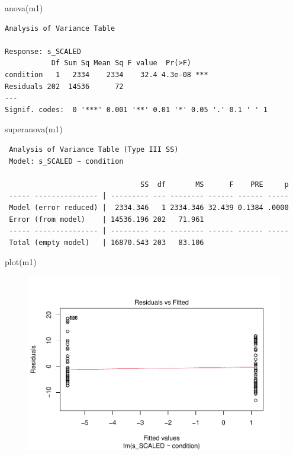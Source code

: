 \documentclass[
  letterpaper,
  DIV=11,
  numbers=noendperiod]{scrreprt}
\newenvironment{Shaded}{\begin{snugshade}}{\end{snugshade}}
\newcommand{\FunctionTok}[1]{\textcolor[rgb]{0.28,0.35,0.67}{#1}}
\newcommand{\NormalTok}[1]{\textcolor[rgb]{0.00,0.23,0.31}{#1}}
\begin{document}
\begin{Shaded}
\begin{Highlighting}[]
\FunctionTok{anova}\NormalTok{(m1)}
\end{Highlighting}
\end{Shaded}

\begin{verbatim}
Analysis of Variance Table

Response: s_SCALED
           Df Sum Sq Mean Sq F value  Pr(>F)    
condition   1   2334    2334    32.4 4.3e-08 ***
Residuals 202  14536      72                    
---
Signif. codes:  0 '***' 0.001 '**' 0.01 '*' 0.05 '.' 0.1 ' ' 1
\end{verbatim}

\begin{Shaded}
\begin{Highlighting}[]
\FunctionTok{superanova}\NormalTok{(m1)}
\end{Highlighting}
\end{Shaded}

\begin{verbatim}
 Analysis of Variance Table (Type III SS)
 Model: s_SCALED ~ condition

                                SS  df       MS      F    PRE     p
 ----- --------------- | --------- --- -------- ------ ------ -----
 Model (error reduced) |  2334.346   1 2334.346 32.439 0.1384 .0000
 Error (from model)    | 14536.196 202   71.961                    
 ----- --------------- | --------- --- -------- ------ ------ -----
 Total (empty model)   | 16870.543 203   83.106                    
\end{verbatim}

\begin{Shaded}
\begin{Highlighting}[]
\FunctionTok{plot}\NormalTok{(m1)}
\end{Highlighting}
\end{Shaded}

\begin{figure}[H]

{\centering \includegraphics{analysis/SGC3A/5_sgc3A_exploration_files/figure-pdf/unnamed-chunk-9-1.pdf}

}

\end{figure}
\end{document}
